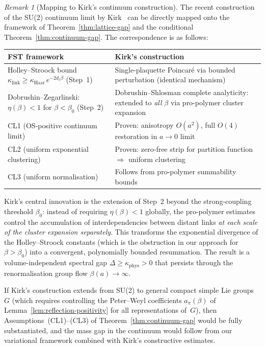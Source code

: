 \documentclass[12pt,a4paper]{article}
\theoremstyle{definition}
\theoremstyle{plain}
\theoremstyle{remark}
\newtheorem{remark}[definition]{Remark}
\begin{document}
\begin{remark}[Mapping to Kirk's continuum construction]\label{rem:kirk-mapping}
The recent construction of the SU(2) continuum limit by
Kirk~\cite{Kirk2026,Kirk2026b} can be directly mapped onto the framework
of Theorem~\ref{thm:lattice-gap} and the conditional
Theorem~\ref{thm:continuum-gap}. The correspondence is as follows:

\begin{center}
\begin{tabular}{p{4.8cm}p{5.2cm}}
\hline
\textbf{FST framework} & \textbf{Kirk's construction} \\
\hline
Holley--Stroock bound $\kappa_{\mathrm{link}} \geq \kappa_{\mathrm{Haar}}\,
e^{-2 d_\ell \beta}$ (Step~1)
& Single-plaquette Poincar\'e via bounded perturbation
  (identical mechanism) \\[4pt]
Dobrushin--Zegarlinski: $\eta(\beta) < 1$ for $\beta < \beta_0$ (Step~2)
& Dobrushin--Shlosman complete analyticity:
  extended to \emph{all} $\beta$ via pro-polymer
  cluster expansion \\[4pt]
CL1 (OS-positive continuum limit)
& Proven: anisotropy $O(a^2)$, full $O(4)$
  restoration in $a \to 0$ limit \\[4pt]
CL2 (uniform exponential clustering)
& Proven: zero-free strip for partition function
  $\Rightarrow$ uniform clustering \\[4pt]
CL3 (uniform normalisation)
& Follows from pro-polymer summability bounds \\
\hline
\end{tabular}
\end{center}

\noindent
Kirk's central innovation is the extension of Step~2 beyond the
strong-coupling threshold $\beta_0$: instead of requiring $\eta(\beta) < 1$
globally, the pro-polymer estimates control the accumulation of
interdependencies between distant links \emph{at each scale of the
cluster expansion separately}. This transforms the exponential
divergence of the Holley--Stroock constants (which is the obstruction
in our approach for $\beta > \beta_0$) into a convergent,
polynomially bounded resummation. The result is a volume-independent
spectral gap $\Delta \geq \kappa_{\mathrm{phys}} > 0$ that persists
through the renormalisation group flow $\beta(a) \to \infty$.

If Kirk's construction extends from SU(2) to general compact simple
Lie groups $G$ (which requires controlling the Peter--Weyl coefficients
$a_\pi(\beta)$ of Lemma~\ref{lem:reflection-positivity} for all
representations of~$G$), then Assumptions~(CL1)--(CL3) of
Theorem~\ref{thm:continuum-gap} would be fully substantiated, and the
mass gap in the continuum would follow from our variational framework
combined with Kirk's constructive estimates.


\end{remark}
\end{document}
